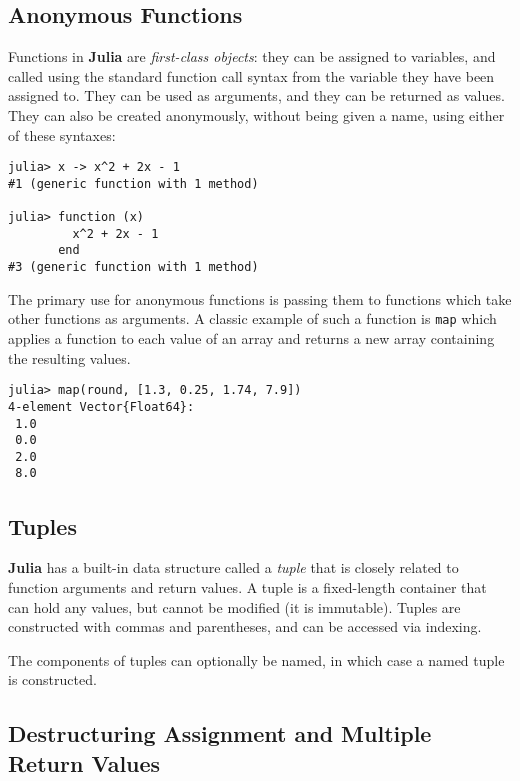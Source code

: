 \documentclass[
]{article}
\begin{document}
\hypertarget{anonymous-functions}{%
\subsection{Anonymous Functions}\label{anonymous-functions}}

Functions in \textbf{Julia} are \emph{first-class objects}: they can be
assigned to variables, and called using the standard function call
syntax from the variable they have been assigned to. They can be used as
arguments, and they can be returned as values. They can also be created
anonymously, without being given a name, using either of these syntaxes:

\begin{verbatim}
julia> x -> x^2 + 2x - 1
#1 (generic function with 1 method)

julia> function (x)
         x^2 + 2x - 1
       end
#3 (generic function with 1 method)
\end{verbatim}

The primary use for anonymous functions is passing them to functions
which take other functions as arguments. A classic example of such a
function is \texttt{map} which applies a function to each value of an
array and returns a new array containing the resulting values.

\begin{verbatim}
julia> map(round, [1.3, 0.25, 1.74, 7.9])
4-element Vector{Float64}:
 1.0
 0.0
 2.0
 8.0
\end{verbatim}

\hypertarget{tuples}{%
\subsection{Tuples}\label{tuples}}

\textbf{Julia} has a built-in data structure called a \emph{tuple} that
is closely related to function arguments and return values. A tuple is a
fixed-length container that can hold any values, but cannot be modified
(it is immutable). Tuples are constructed with commas and parentheses,
and can be accessed via indexing.

The components of tuples can optionally be named, in which case a named
tuple is constructed.

\hypertarget{destructuring-assignment-and-multiple-return-values}{%
\subsection{Destructuring Assignment and Multiple Return
Values}\label{destructuring-assignment-and-multiple-return-values}}
\end{document}
